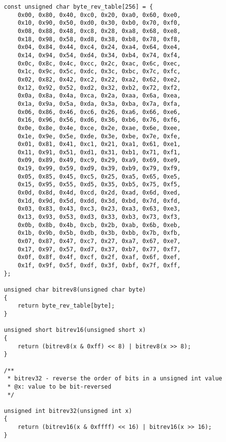 \begin{lstlisting}
const unsigned char byte_rev_table[256] = {
	0x00, 0x80, 0x40, 0xc0, 0x20, 0xa0, 0x60, 0xe0,
	0x10, 0x90, 0x50, 0xd0, 0x30, 0xb0, 0x70, 0xf0,
	0x08, 0x88, 0x48, 0xc8, 0x28, 0xa8, 0x68, 0xe8,
	0x18, 0x98, 0x58, 0xd8, 0x38, 0xb8, 0x78, 0xf8,
	0x04, 0x84, 0x44, 0xc4, 0x24, 0xa4, 0x64, 0xe4,
	0x14, 0x94, 0x54, 0xd4, 0x34, 0xb4, 0x74, 0xf4,
	0x0c, 0x8c, 0x4c, 0xcc, 0x2c, 0xac, 0x6c, 0xec,
	0x1c, 0x9c, 0x5c, 0xdc, 0x3c, 0xbc, 0x7c, 0xfc,
	0x02, 0x82, 0x42, 0xc2, 0x22, 0xa2, 0x62, 0xe2,
	0x12, 0x92, 0x52, 0xd2, 0x32, 0xb2, 0x72, 0xf2,
	0x0a, 0x8a, 0x4a, 0xca, 0x2a, 0xaa, 0x6a, 0xea,
	0x1a, 0x9a, 0x5a, 0xda, 0x3a, 0xba, 0x7a, 0xfa,
	0x06, 0x86, 0x46, 0xc6, 0x26, 0xa6, 0x66, 0xe6,
	0x16, 0x96, 0x56, 0xd6, 0x36, 0xb6, 0x76, 0xf6,
	0x0e, 0x8e, 0x4e, 0xce, 0x2e, 0xae, 0x6e, 0xee,
	0x1e, 0x9e, 0x5e, 0xde, 0x3e, 0xbe, 0x7e, 0xfe,
	0x01, 0x81, 0x41, 0xc1, 0x21, 0xa1, 0x61, 0xe1,
	0x11, 0x91, 0x51, 0xd1, 0x31, 0xb1, 0x71, 0xf1,
	0x09, 0x89, 0x49, 0xc9, 0x29, 0xa9, 0x69, 0xe9,
	0x19, 0x99, 0x59, 0xd9, 0x39, 0xb9, 0x79, 0xf9,
	0x05, 0x85, 0x45, 0xc5, 0x25, 0xa5, 0x65, 0xe5,
	0x15, 0x95, 0x55, 0xd5, 0x35, 0xb5, 0x75, 0xf5,
	0x0d, 0x8d, 0x4d, 0xcd, 0x2d, 0xad, 0x6d, 0xed,
	0x1d, 0x9d, 0x5d, 0xdd, 0x3d, 0xbd, 0x7d, 0xfd,
	0x03, 0x83, 0x43, 0xc3, 0x23, 0xa3, 0x63, 0xe3,
	0x13, 0x93, 0x53, 0xd3, 0x33, 0xb3, 0x73, 0xf3,
	0x0b, 0x8b, 0x4b, 0xcb, 0x2b, 0xab, 0x6b, 0xeb,
	0x1b, 0x9b, 0x5b, 0xdb, 0x3b, 0xbb, 0x7b, 0xfb,
	0x07, 0x87, 0x47, 0xc7, 0x27, 0xa7, 0x67, 0xe7,
	0x17, 0x97, 0x57, 0xd7, 0x37, 0xb7, 0x77, 0xf7,
	0x0f, 0x8f, 0x4f, 0xcf, 0x2f, 0xaf, 0x6f, 0xef,
	0x1f, 0x9f, 0x5f, 0xdf, 0x3f, 0xbf, 0x7f, 0xff,
};

unsigned char bitrev8(unsigned char byte)
{
	return byte_rev_table[byte];
}

unsigned short bitrev16(unsigned short x)
{
	return (bitrev8(x & 0xff) << 8) | bitrev8(x >> 8);
}

/**
 * bitrev32 - reverse the order of bits in a unsigned int value
 * @x: value to be bit-reversed
 */

unsigned int bitrev32(unsigned int x)
{
	return (bitrev16(x & 0xffff) << 16) | bitrev16(x >> 16);
}
\end{lstlisting}

\subsection{}


